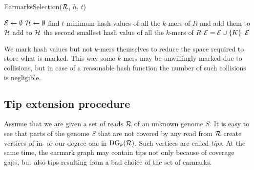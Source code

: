 \documentclass[12pt]{article}
\begin{document}

\begin{algorithm}
\caption{EarmarksSelection(${\cal R}$, $h$, $t$)}
\label{alg:earmarksselection}
\begin{algorithmic}[1] %
  \STATE ${\cal E} \gets \emptyset$ 
  \STATE ${\cal H} \gets \emptyset$ 
    \STATE find $t$ minimum hash values of all the $k$-mers of $R$ and 
    add them to ${\cal H}$
  \ENDFOR
      \STATE add to ${\cal H}$ the second smallest hash value of all the 
      $k$-mers of $R$
    \ENDFOR
  \ENDIF
        \STATE ${\cal E} = {\cal E} \cup \{K\}$
      \ENDIF
    \ENDFOR
  \ENDFOR
  \RETURN ${\cal E}$
\end{algorithmic}
\end{algorithm}

We mark hash values but not $k$-mers themselves to reduce the space 
required to store what is marked. This way some $k$-mers may be unwillingly marked due 
to collisions, but in case of a reasonable hash function the number of 
such collisions is negligible.


\subsection{Tip extension procedure}
Assume that we are given a set of reads ${\cal R}$ of an unknown genome $S$.
It is easy to see that parts of the genome $S$ that are not covered by any read
from ${\cal R}$ create vertices of in- or our-degree one in $\textrm{DG}_k({\cal R})$.
Such vertices are called \emph{tips}. At the same time, the earmark graph may contain
tips not only because of coverage gaps, but also tips resulting from a bad choice of the 
set of earmarks. 
\end{document}
